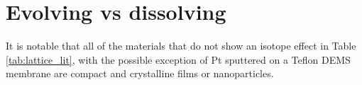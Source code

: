 
\section{Evolving vs dissolving}\label{sec:dissolving}



It is notable that all of the materials that do not show an isotope effect in Table \ref{tab:lattice_lit}, with the possible exception of Pt sputtered on a Teflon DEMS membrane\cite{Willsau1985} are compact and crystalline films or nanoparticles\cite{Stoerzinger2017, Roy2018, Geiger2018}.

